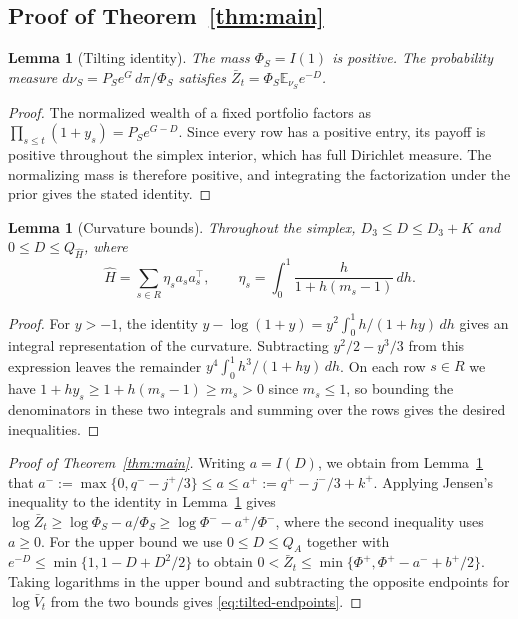 \documentclass{article}
\numberwithin{equation}{section}
\newtheorem{lemma}[theorem]{Lemma}
\theoremstyle{remark}
\newcommand{\E}{\mathbb E}
\begin{document}
\subsection{Proof of Theorem~\ref{thm:main}}

\begin{lemma}[Tilting identity]\label{lem:tilting-identity}
The mass $\Phi_S=I(1)$ is positive. The probability measure
$d\nu_S=P_S e^G\,d\pi/\Phi_S$ satisfies
$\bar Z_t=\Phi_S\E_{\nu_S}e^{-D}$.
\end{lemma}
\begin{proof}
The normalized wealth of a fixed portfolio factors as
$\prod_{s\le t}(1+y_s)=P_S e^{G-D}$. Since every row has a positive
entry, its payoff is positive throughout the simplex interior, which
has full Dirichlet measure. The normalizing mass is therefore positive,
and integrating the factorization under the prior gives the stated identity.
\end{proof}

\begin{lemma}[Curvature bounds]\label{lem:curvature-majorant}
Throughout the simplex, $D_3\le D\le D_3+K$ and $0\le D\le Q_{\widehat H}$, where
\[
 \widehat H=\sum_{s\in R}\eta_s a_sa_s^\top,\qquad
 \eta_s=\int_0^1\frac{h}{1+h(m_s-1)}\,dh .
\]
\end{lemma}
\begin{proof}
For $y>-1$, the identity $y-\log(1+y)=y^2\int_0^1h/(1+hy)\,dh$
gives an integral representation of the curvature. Subtracting
$y^2/2-y^3/3$ from this expression leaves the remainder
$y^4\int_0^1h^3/(1+hy)\,dh$. On each row $s\in R$ we have
$1+h y_s\ge1+h(m_s-1)\ge m_s>0$ since $m_s\le1$, so bounding the
denominators in these two integrals and summing over the rows gives
the desired inequalities.
\end{proof}

\begin{proof}[Proof of Theorem~\ref{thm:main}]
Writing $a=I(D)$, we obtain from Lemma~\ref{lem:curvature-majorant} that
$a^-:=\max\{0,q^- - j^+/3\}\le a\le a^+:=q^+-j^-/3+k^+$.
Applying Jensen's inequality to the identity in
Lemma~\ref{lem:tilting-identity} gives
$\log\bar Z_t\ge\log\Phi_S-a/\Phi_S\ge\log\Phi^--a^+/\Phi^-$,
where the second inequality uses $a\ge0$. For the upper bound we use
$0\le D\le Q_A$ together with
$e^{-D}\le\min\{1,1-D+D^2/2\}$ to obtain
$0<\bar Z_t\le\min\{\Phi^+,\Phi^+-a^-+b^+/2\}$.
Taking logarithms in the upper bound and subtracting the opposite
endpoints for $\log\bar V_t$ from the two bounds gives
\eqref{eq:tilted-endpoints}.
\end{proof}
\end{document}
